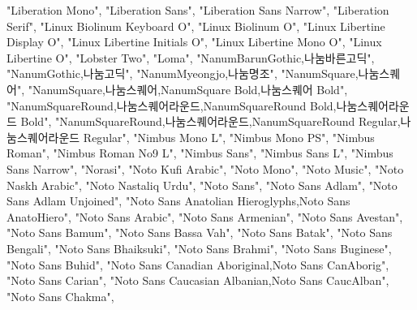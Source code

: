 \documentclass[
]{article}
\newenvironment{Shaded}{\begin{snugshade}}{\end{snugshade}}
\newcommand{\NormalTok}[1]{#1}
\newcommand{\StringTok}[1]{\textcolor[rgb]{0.31,0.60,0.02}{#1}}
\begin{document}
\begin{Shaded}
\begin{Highlighting}[]
  \StringTok{"Liberation Mono"}\NormalTok{,}
  \StringTok{"Liberation Sans"}\NormalTok{,}
  \StringTok{"Liberation Sans Narrow"}\NormalTok{,}
  \StringTok{"Liberation Serif"}\NormalTok{,}
  \StringTok{"Linux Biolinum Keyboard O"}\NormalTok{,}
  \StringTok{"Linux Biolinum O"}\NormalTok{,}
  \StringTok{"Linux Libertine Display O"}\NormalTok{,}
  \StringTok{"Linux Libertine Initials O"}\NormalTok{,}
  \StringTok{"Linux Libertine Mono O"}\NormalTok{,}
  \StringTok{"Linux Libertine O"}\NormalTok{,}
  \StringTok{"Lobster Two"}\NormalTok{,}
  \StringTok{"Loma"}\NormalTok{,}
  \StringTok{"NanumBarunGothic,나눔바른고딕"}\NormalTok{,}
  \StringTok{"NanumGothic,나눔고딕"}\NormalTok{,}
  \StringTok{"NanumMyeongjo,나눔명조"}\NormalTok{,}
  \StringTok{"NanumSquare,나눔스퀘어"}\NormalTok{,}
  \StringTok{"NanumSquare,나눔스퀘어,NanumSquare Bold,나눔스퀘어 Bold"}\NormalTok{,}
  \StringTok{"NanumSquareRound,나눔스퀘어라운드,NanumSquareRound Bold,나눔스퀘어라운드 Bold"}\NormalTok{,}
  \StringTok{"NanumSquareRound,나눔스퀘어라운드,NanumSquareRound Regular,나눔스퀘어라운드 Regular"}\NormalTok{,}
  \StringTok{"Nimbus Mono L"}\NormalTok{,}
  \StringTok{"Nimbus Mono PS"}\NormalTok{,}
  \StringTok{"Nimbus Roman"}\NormalTok{,}
  \StringTok{"Nimbus Roman No9 L"}\NormalTok{,}
  \StringTok{"Nimbus Sans"}\NormalTok{,}
  \StringTok{"Nimbus Sans L"}\NormalTok{,}
  \StringTok{"Nimbus Sans Narrow"}\NormalTok{,}
  \StringTok{"Norasi"}\NormalTok{,}
  \StringTok{"Noto Kufi Arabic"}\NormalTok{,}
  \StringTok{"Noto Mono"}\NormalTok{,}
  \StringTok{"Noto Music"}\NormalTok{,}
  \StringTok{"Noto Naskh Arabic"}\NormalTok{,}
  \StringTok{"Noto Nastaliq Urdu"}\NormalTok{,}
  \StringTok{"Noto Sans"}\NormalTok{,}
  \StringTok{"Noto Sans Adlam"}\NormalTok{,}
  \StringTok{"Noto Sans Adlam Unjoined"}\NormalTok{,}
  \StringTok{"Noto Sans Anatolian Hieroglyphs,Noto Sans AnatoHiero"}\NormalTok{,}
  \StringTok{"Noto Sans Arabic"}\NormalTok{,}
  \StringTok{"Noto Sans Armenian"}\NormalTok{,}
  \StringTok{"Noto Sans Avestan"}\NormalTok{,}
  \StringTok{"Noto Sans Bamum"}\NormalTok{,}
  \StringTok{"Noto Sans Bassa Vah"}\NormalTok{,}
  \StringTok{"Noto Sans Batak"}\NormalTok{,}
  \StringTok{"Noto Sans Bengali"}\NormalTok{,}
  \StringTok{"Noto Sans Bhaiksuki"}\NormalTok{,}
  \StringTok{"Noto Sans Brahmi"}\NormalTok{,}
  \StringTok{"Noto Sans Buginese"}\NormalTok{,}
  \StringTok{"Noto Sans Buhid"}\NormalTok{,}
  \StringTok{"Noto Sans Canadian Aboriginal,Noto Sans CanAborig"}\NormalTok{,}
  \StringTok{"Noto Sans Carian"}\NormalTok{,}
  \StringTok{"Noto Sans Caucasian Albanian,Noto Sans CaucAlban"}\NormalTok{,}
  \StringTok{"Noto Sans Chakma"}\NormalTok{,}

\end{Highlighting}
\end{Shaded}
\end{document}
